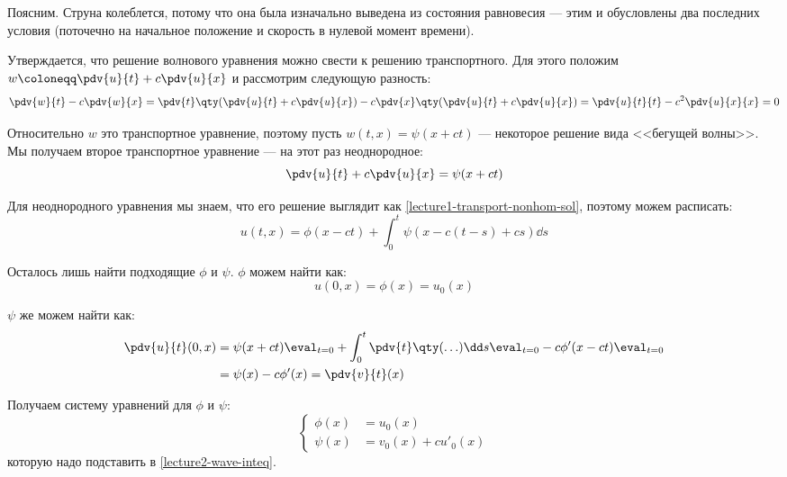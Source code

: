 Поясним. Струна колеблется, потому что она была изначально выведена из состояния равновесия --- этим и обусловлены два последних условия (поточечно на начальное положение и скорость в нулевой момент времени).

Утверждается, что решение волнового уравнения можно свести к решению транспортного. Для этого положим $w \coloneqq \pdv{u}{t} + c \pdv{u}{x}$ и рассмотрим следующую разность:
%
\begin{equation*}
  \pdv{w}{t} - c \pdv{w}{x} = \pdv{t} \qty(\pdv{u}{t} + c \pdv{u}{x}) - c \pdv{x} \qty(\pdv{u}{t} + c \pdv{u}{x}) = \pdv{u}{t}{t} - c^2 \pdv{u}{x}{x} = 0
\end{equation*}

Относительно $w$ это транспортное уравнение, поэтому пусть $w(t, x) = \psi(x + ct)$ --- некоторое решение вида <<бегущей волны>>. Мы получаем второе транспортное уравнение --- на этот раз неоднородное:
%
\begin{equation*}
  \pdv{u}{t} + c \pdv{u}{x} = \psi(x + ct)
\end{equation*}

Для неоднородного уравнения мы знаем, что его решение выглядит как \eqref{lecture1-transport-nonhom-sol}, поэтому можем расписать:
%
\begin{equation}
  u(t, x) = \phi(x - ct) + \int_0^t \psi(x - c(t-s) + cs) \dd s
  \label{lecture2-wave-inteq}
\end{equation}

Осталось лишь найти подходящие $\phi$ и $\psi$. $\phi$ можем найти как:
%
\begin{equation*}
  u(0, x) = \phi(x) = u_0(x)
\end{equation*}

$\psi$ же можем найти как:
%
\begin{equation*}
  \begin{aligned}
    \pdv{u}{t} (0, x)
    &= \psi(x + ct) \eval_{t = 0} + \int_0^t \pdv{t} \qty(\ldots) \dd s \eval_{t = 0} - c \phi' (x - ct) \eval_{t = 0} \\
    &= \psi(x) - c \phi'(x) = \pdv{v}{t} (x)
  \end{aligned}
\end{equation*}

Получаем систему уравнений для $\phi$ и $\psi$:
%
\begin{equation*}
  \left\{\begin{aligned}
    \phi(x) &= u_0(x) \\
    \psi(x) &= v_0(x) + cu'_0(x)
  \end{aligned}\right.
\end{equation*}
%
которую надо подставить в \eqref{lecture2-wave-inteq}.

